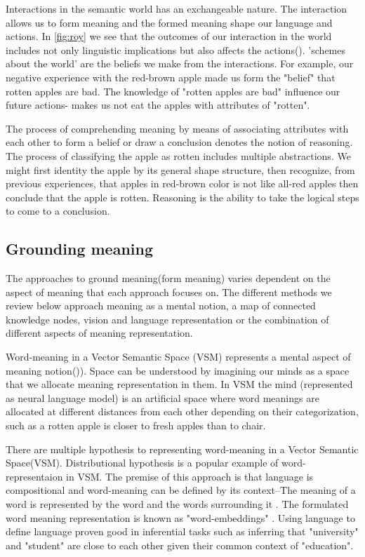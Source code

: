\documentclass[11pt, a4paper]{article}
\begin{document}
Interactions in the semantic world  has an exchangeable nature. The interaction allows us to form meaning and the formed meaning shape our language and actions. In \ref{fig:roy} we see that the outcomes of our interaction in the world includes not only linguistic implications but also affects the actions(\cite{roy2005semiotic}). 'schemes about the world' are the beliefs we make from the interactions. For example, our negative experience with the red-brown apple made us form the  "belief" that rotten apples are bad. The knowledge of "rotten apples are bad" influence our future actions- makes us not eat the apples with attributes of "rotten". 

The process of comprehending meaning by means of associating attributes with each other to form a belief or draw a conclusion denotes the notion of reasoning. The process of classifying the apple as rotten includes multiple abstractions. We might first identity the apple by its general shape structure, then recognize, from previous experiences, that  apples in red-brown color is not like all-red apples then conclude that the apple is rotten. Reasoning is the ability to take the logical steps to come to a conclusion.  
 


\subsection{Grounding meaning}

The approaches to ground meaning(form meaning) varies dependent on the aspect of meaning that each approach focuses on. The different methods we review below approach meaning as a mental notion, a map of connected knowledge nodes,  vision and language representation or  the combination of different aspects of meaning representation. 


Word-meaning in a Vector Semantic Space (VSM) represents a mental aspect of meaning notion(\cite{Turney_2010})). Space can be understood by imagining our minds as a space that we allocate meaning representation in them. In VSM the mind (represented as neural language model) is an artificial space where word meanings are allocated at different distances from each other depending on their categorization, such as a rotten apple is closer to fresh apples than to chair. 

There are multiple hypothesis to representing word-meaning in a Vector Semantic Space(VSM). Distributional hypothesis is a popular example of word-representaion in VSM. The premise of this approach is that language is compositional and word-meaning can be defined by its context--The meaning of a word is represented by the word and the words surrounding it \cite{Turney_2010}. The formulated word meaning representation is known as "word-embeddings" \cite{mikolov2013distributed}. Using language to define language proven good in inferential tasks such as inferring that "university" and "student" are close to each other given their common context of "education". 
 
\end{document}
